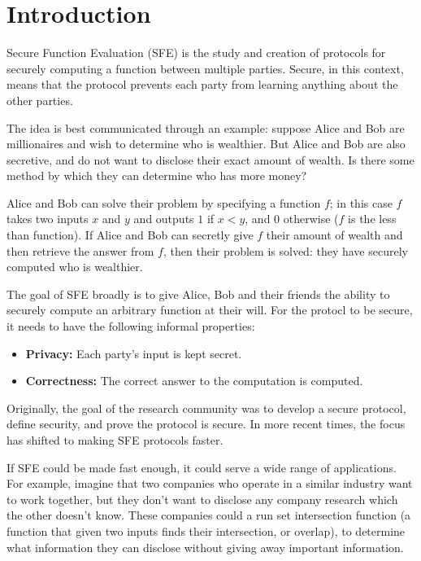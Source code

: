 \chapter*{Introduction}
\doublespacing

Secure Function Evaluation (SFE) is the study and creation of protocols for securely computing a function between multiple parties. 
Secure, in this context, means that the protocol prevents each party from learning anything about the other parties. 

The idea is best communicated through an example: suppose Alice and Bob are millionaires and wish to determine who is wealthier. 
But Alice and Bob are also secretive, and do not want to disclose their exact amount of wealth. 
Is there some method by which they can determine who has more money?

Alice and Bob can solve their problem by specifying a function $f$; in this case $f$ takes two inputs $x$ and $y$ and outputs $1$ if $x < y$, and $0$ otherwise ($f$ is the less than function).
If Alice and Bob can secretly give $f$ their amount of wealth and then retrieve the answer from $f$, then their problem is solved: they have securely computed who is wealthier.

The goal of SFE broadly is to give Alice, Bob and their friends the ability to securely compute an arbitrary function at their will. 
For the protocl to be secure, it needs to have the following informal properties:
\begin{itemize}
    \item \textbf{Privacy:} Each party's input is kept secret.
    \item \textbf{Correctness:} The correct answer to the computation is computed.
\end{itemize}

Originally, the goal of the research community was to develop a secure protocol, define security, and prove the protocol is secure.
In more recent times, the focus has shifted to making SFE protocols faster.

If SFE could be made fast enough, it could serve a wide range of applications.
For example, imagine that two companies who operate in a similar industry want to work together, but they don't want to disclose any company research which the other doesn't know.
These companies could a run set intersection function (a function that given two inputs finds their intersection, or overlap), to determine what information they can disclose without giving away important information.

